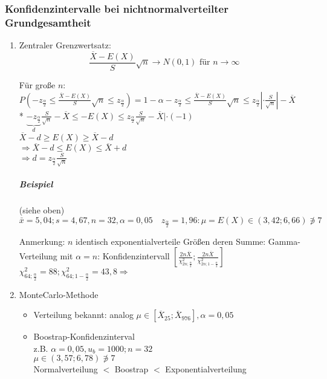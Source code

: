 \documentclass[a4paper]{scrartcl}
\begin{document}
\subsubsection{Konfidenzintervalle bei nichtnormalverteilter Grundgesamtheit}
\begin{enumerate}
\item Zentraler Grenzwertsatz:
\[ \frac{\overline{X} -E(X)}{S} \sqrt{n} \rightarrow N(0,1) \text{ für } n \to \infty\]

Für große $n$:
$P(-z_{\frac{\alpha}{2}} \leq \frac{\overline{X} - E(X)}{S} \sqrt{n} \leq z_{\frac{\alpha}{2}}) = 1-\alpha - z_{\frac{\alpha}{2}} \leq \frac{\overline{X}-E(X)}{S} \sqrt{n} \leq z_{\frac{\alpha}{2}} | \cdot \frac{S}{\sqrt{n}} | - \overline{X}$\\*
$\underbrace{-z_{\frac{\alpha}{2}}}_d \frac{S}{\sqrt{n}} - \overline{X} \leq - E(X) \leq z_{\frac{\alpha}{2}} \frac{S}{\sqrt{n}} - \overline{X} | \cdot (-1)$\\
$\overline{X} - d \geq E(X) \geq \overline{X} -d$\\
$\Rightarrow \overline{X} - d \leq E(X) \leq \overline{X} +d$\\
$\Rightarrow d = z_{\frac{\alpha}{2}} \frac{S}{\sqrt{n}}$\\


\subparagraph{Beispiel} (siehe oben) $\bar{x} = 5,04; s= 4,67, n=32, \alpha = 0,05 \quad z_{\frac{\alpha}{2}} = 1,96: \mu = E(X) \in (3,42;6,66) \notni 7$

Anmerkung: $n$ identisch exponentialverteile Größen deren Summe: Gamma-Verteilung mit $\alpha = n$: Konfidenzintervall $[ \frac{2n\overline{X}}{\chi_{2n;\frac{\alpha}{2}}^2};\frac{2n\overline{X}}{\chi_{2n;1-\frac{\alpha}{2}}^2}]$
$\chi^2_{64;\frac{\alpha}{2}} = 88; \chi^2_{64;1- \frac{\alpha}{2}} = 43,8 \Rightarrow$

\item MonteCarlo-Methode

\begin{itemize}
\item Verteilung bekannt: analog $\mu \in [\overline{X}_{25}; \overline{X}_{976} ] , \alpha = 0,05$
\item Boostrap-Konfidenzinterval\\
z.B. $\alpha = 0,05, u_b = 1000; n=32$\\
$\mu \in (3,57;6,78) \notni 7$\\
Normalverteilung $<$ Boostrap $<$ Exponentialverteilung
\end{itemize}
\end{enumerate}
\end{document}
